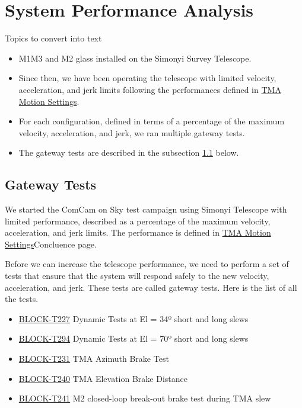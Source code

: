 \section{System Performance Analysis}
\label{sec:system_performance_analysis}

\newcommand{\TMAMotionSettings}{\href{https://rubinobs.atlassian.net/wiki/spaces/LSSTCOM/pages/53741249/TMA+Motion+Settings}{TMA Motion Settings}}
\newcommand{\testCase}[1]{\href{https://rubinobs.atlassian.net/projects/BLOCK?selectedItem=com.atlassian.plugins.atlassian-connect-plugin:com.kanoah.test-manager__main-project-page\#!/v2/testCase/#1}{#1}}

Topics to convert into text

\begin{itemize}
    \item M1M3 and M2 glass installed on the Simonyi Survey Telescope.
    \item Since then, we have been operating the telescope with limited velocity,
    acceleration, and jerk limits following the performances defined in \TMAMotionSettings.
    \item For each configuration, defined in terms of a percentage of the maximum
    velocity, acceleration, and jerk, we ran multiple gateway tests.
    \item The gateway tests are described in the subsection \ref{subsec:gateway_tests} below.
\end{itemize}

\subsection{Gateway Tests}
\label{subsec:gateway_tests}

We started the ComCam on Sky test campaign using Simonyi Telescope with limited
performance, described as a percentage of the maximum velocity, acceleration,
and jerk limits. The performance is defined in \TMAMotionSettings Concluence page.

Before we can increase the telescope performance, we need to perform a set of
tests that ensure that the system will respond safely to the new velocity, acceleration,
and jerk. These tests are called gateway tests. Here is the list of all the tests.

\begin{itemize}
    \item \testCase{BLOCK-T227} Dynamic Tests at El = 34º short and long slews
    \item \testCase{BLOCK-T294} Dynamic Tests at El = 70º short and long slews
    \item \testCase{BLOCK-T231} TMA Azimuth Brake Test
    \item \testCase{BLOCK-T240} TMA Elevation Brake Distance
    \item \testCase{BLOCK-T241} M2 closed-loop break-out brake test during TMA slew
\end{itemize}


